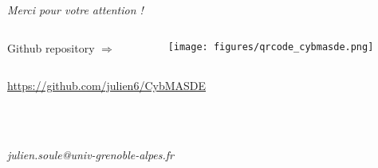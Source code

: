 

\section*{\phantom{Thanks}}

\begin{frame}{}

  \vspace{6ex}

  \centering
  {
    \Huge
    \emph{Merci pour votre attention !}
  }

  \vspace{6ex}

  \begin{columns}

    \hspace{-27ex}

    \begin{column}{0.5\textwidth}
      \raggedleft
      {\Large Github repository $\Longrightarrow$}
    \end{column}

    \hspace{-12ex}

    \begin{column}{0.5\textwidth}
      \texttt{[image: figures/qrcode\_cybmasde.png]}
    \end{column}

  \end{columns}

  \vspace{3ex}

  \centering
  {\Large
    \url{https://github.com/julien6/CybMASDE}}

  \ \\

  \

  \textit{julien.soule@univ-grenoble-alpes.fr}

\end{frame}
